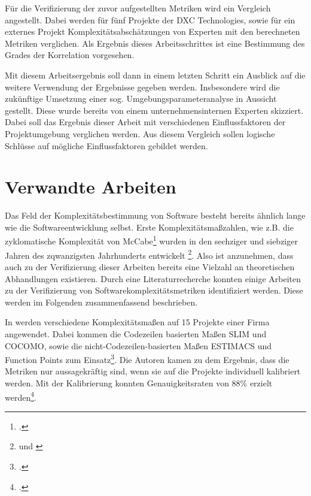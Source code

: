 Für die Verifizierung der zuvor aufgestellten Metriken wird ein
Vergleich angestellt. Dabei werden für fünf Projekte der DXC
Technologies, sowie für ein externes Projekt Komplexitätsabschätzungen
von Experten mit den berechneten Metriken verglichen. Als Ergebnis
dieses Arbeitsschrittes ist eine Bestimmung des Grades der Korrelation
vorgesehen.

Mit diesem Arbeitsergebnis soll dann in einem letzten Schritt ein
Ausblick auf die weitere Verwendung der Ergebnisse gegeben werden.
Insbesondere wird die zukünftige Umsetzung einer sog.
Umgebungsparameteranalyse in Aussicht gestellt. Diese wurde bereits von
einem unternehmensinternen Experten skizziert. Dabei soll das Ergebnis
dieser Arbeit mit verschiedenen Einflussfaktoren der Projektumgebung
verglichen werden. Aus diesem Vergleich sollen logische Schlüsse auf
mögliche Einflussfaktoren gebildet werden.

\section{Verwandte Arbeiten}\label{verwandte-arbeiten}

Das Feld der Komplexitätsbestimmung von Software besteht bereits ähnlich
lange wie die Softwareentwicklung selbst. Erste
Komplexitätsma\ss zahlen, wie z.B. die zyklomatische Komplexität von
McCabe\footcite[Vgl. ][]{mccabeComplexityMeasure1976} wurden in den sechziger und
siebziger Jahren des zqwanzigsten Jahrhunderts entwickelt \footnote{\cite[Vgl. ][S. 25]{zuseSoftwareComplexityMeasures1991} und \cite[][]{rubeyQuantitativeMeasurementProgram1968}}. Also ist
anzunehmen, dass auch zu der Verifizierung dieser Arbeiten bereits eine
Vielzahl an theoretischen Abhandlungen existieren. Durch eine
Literaturrecherche konnten einige Arbeiten zu der Verifizierung von
Softwarekomplexitätsmetriken identifiziert werden. Diese werden im
Folgenden zusammenfassend beschrieben.

In \cite[][]{kemererEmpiricalValidationSoftware1987} werden verschiedene
Komplexitätsma\ss en auf 15 Projekte einer Firma angewendet. Dabei kommen
die Codezeilen basierten Ma\ss en SLIM und COCOMO, sowie die
nicht-Codezeilen-basierten Ma\ss en ESTIMACS und Function Points zum
Einsatz\footcite[Vgl. ][S. 2]{kemererEmpiricalValidationSoftware1987}. Die Autoren kamen zu dem Ergebnis, dass
die Metriken nur aussagekräftig sind, wenn sie auf die Projekte
individuell kalibriert werden. Mit der Kalibrierung konnten
Genauigkeitsraten von 88\% erzielt werden\footcite[Vgl. ][S. 12]{kemererEmpiricalValidationSoftware1987}.

